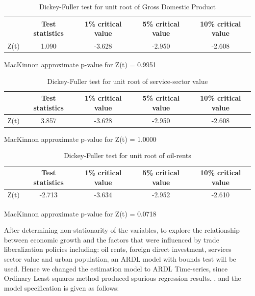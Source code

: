 \documentclass[12pt,a4 paper,title page]{article}
\begin{document}
\hfill \break
\hfill \break
\hfill \break
\hfill \break
\begin{table}[ht]
\begin{tabular}{||c c c c c||} 
\hline
   & Test statistics & 1\% critical value & 5\% critical value & 10\% critical value \\ [0.5ex] 
 \hline\hline
   Z(t) & 1.090 &  -3.628    &  -2.950  & -2.608 \\ 
\end{tabular}
\caption{Dickey-Fuller test for unit root of Gross Domestic Product}
\label{table2}
\end{table}
MacKinnon approximate p-value for Z(t) = 0.9951
\hfill \break
\hfill \break
\begin{table}[ht]
 \begin{tabular}{||c c c c c||} 
 \hline
   & Test statistics & 1\% critical value & 5\% critical value & 10\% critical value \\ [0.5ex]  \hline\hline
   Z(t) &  3.857  &  -3.628   &  -2.950  & -2.608 \\ 
\end{tabular} 
\caption{Dickey-Fuller test for unit root of service-sector value}
\label{table3}
\end{table}
 
MacKinnon approximate p-value for Z(t) =  1.0000
\hfill \break
\hfill \break

\begin{table}[ht]
\begin{tabular}{||c c c c c||} 
 \hline
   & Test statistics & 1\% critical value & 5\% critical value & 10\% critical value \\ [0.5ex] 
 \hline\hline
   Z(t) &  -2.713   &  -3.634  &   -2.952  &  -2.610 \\ 
\end{tabular}
\caption{Dickey-Fuller test for unit root of oil-rents}
\label{table4}
\end{table}

MacKinnon approximate p-value for Z(t) = 0.0718
\hfill \break
\hfill \break

\begin{flushleft}
\justifying
After determining non-stationarity of the variables, 
to explore the relationship between economic growth and the factors that were influenced by trade liberalization policies including: oil rents, foreign direct investment, services sector value and urban population, an ARDL model with bounds test will be used. 
Hence we changed the estimation model to ARDL Time-series, since Ordinary Least squares method produced spurious regression results. \citep{SHRESTHA201871}. 
and the model specification is given as follows:
\end{flushleft}
\end{document}

